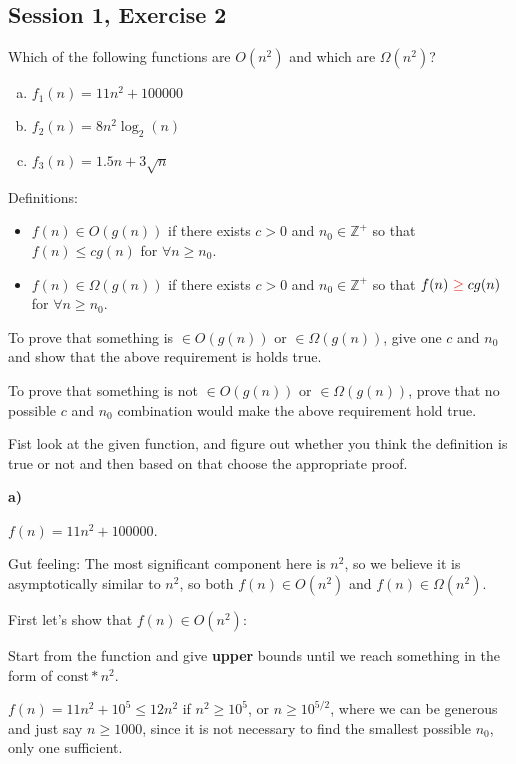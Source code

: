 \subsection{Session 1, Exercise 2}


Which of the following functions are $O(n^2)$ and which are $\Omega(n^2)$?

\begin{enumerate}[a.)]
\item $f_1(n) = 11n^2 + 100000$
\item $f_2(n) = 8n^2\log_2(n)$
\item $f_3(n) = 1.5n + 3\sqrt{n}$
\end{enumerate}


Definitions:

\begin{itemize}
    \item $f(n)\in{}O(g(n))$ if there exists $c>0$ and $n_0\in{}\mathds{Z^+}$ so that $f(n) \leq{} cg(n)$ for $\forall{}n\geq{}n_0$.
    \item $f(n)\in{}\Omega(g(n))$ if there exists $c>0$ and $n_0\in{}\mathds{Z^+}$ so that $f(n)\text{ }\color{red}\mathbf{\geq{}}\color{black} cg(n)$ for $\forall{}n\geq{}n_0$.
\end{itemize}

To prove that something is $\in{}O(g(n))$ or $\in{}\Omega(g(n))$, give one $c$ and $n_0$ and show that the above requirement is holds true.

To prove that something is not $\in{}O(g(n))$ or $\in{}\Omega(g(n))$, prove that no possible $c$ and $n_0$ combination would make the above requirement hold true.

Fist look at the given function, and figure out whether you think the definition is true or not and then based on that choose the appropriate proof.

\textbf{a)}

$f(n) = 11n^2 + 100000$.

Gut feeling: The most significant component here is $n^2$, so we believe it is asymptotically similar to $n^2$, so both $f(n)\in{}O(n^2)$ and $f(n)\in{}\Omega(n^2)$.

First let's show that $f(n)\in{}O(n^2)$:

Start from the function and give \textbf{upper} bounds until we reach something in the form of $\text{const}*n^2$.

$f(n) = 11n^2 + 10^5 \leq{} 12n^2$ if $n^2 \geq{} 10^5$, or $n \geq{} 10^{5/2}$, where we can be generous and just say $n \geq{} 1000$, since it is not necessary to find the smallest possible $n_0$, only one sufficient.

